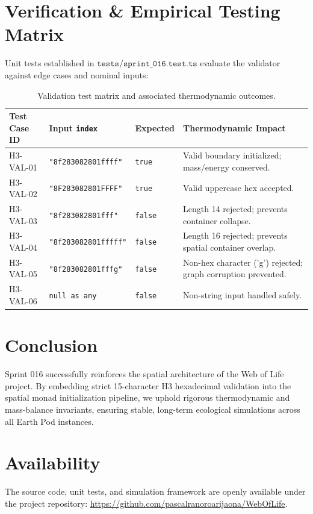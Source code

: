 \documentclass[11pt, a4paper]{article}
\begin{document}
\section{Verification \& Empirical Testing Matrix}
Unit tests established in $\texttt{tests/sprint\_016.test.ts}$ evaluate the validator against edge cases and nominal inputs:

\begin{table}[htbp]
\centering
\begin{tabular}{llll}
\toprule
\textbf{Test Case ID} & \textbf{Input \texttt{index}} & \textbf{Expected} & \textbf{Thermodynamic Impact} \\
\midrule
H3-VAL-01 & \texttt{"8f283082801ffff"} & \texttt{true} & Valid boundary initialized; mass/energy conserved. \\
H3-VAL-02 & \texttt{"8F283082801FFFF"} & \texttt{true} & Valid uppercase hex accepted. \\
H3-VAL-03 & \texttt{"8f283082801fff"}  & \texttt{false} & Length 14 rejected; prevents container collapse. \\
H3-VAL-04 & \texttt{"8f283082801fffff"} & \texttt{false} & Length 16 rejected; prevents spatial container overlap. \\
H3-VAL-05 & \texttt{"8f283082801fffg"} & \texttt{false} & Non-hex character ('g') rejected; graph corruption prevented. \\
H3-VAL-06 & \texttt{null as any}       & \texttt{false} & Non-string input handled safely. \\
\bottomrule
\end{tabular}
\caption{Validation test matrix and associated thermodynamic outcomes.}
\label{tab:verification}
\end{table}

\section{Conclusion}
Sprint 016 successfully reinforces the spatial architecture of the Web of Life project. By embedding strict 15-character H3 hexadecimal validation into the spatial monad initialization pipeline, we uphold rigorous thermodynamic and mass-balance invariants, ensuring stable, long-term ecological simulations across all Earth Pod instances.

\section*{Availability}
The source code, unit tests, and simulation framework are openly available under the project repository: \url{https://github.com/pascalranoroarijaona/WebOfLife}.
\end{document}
